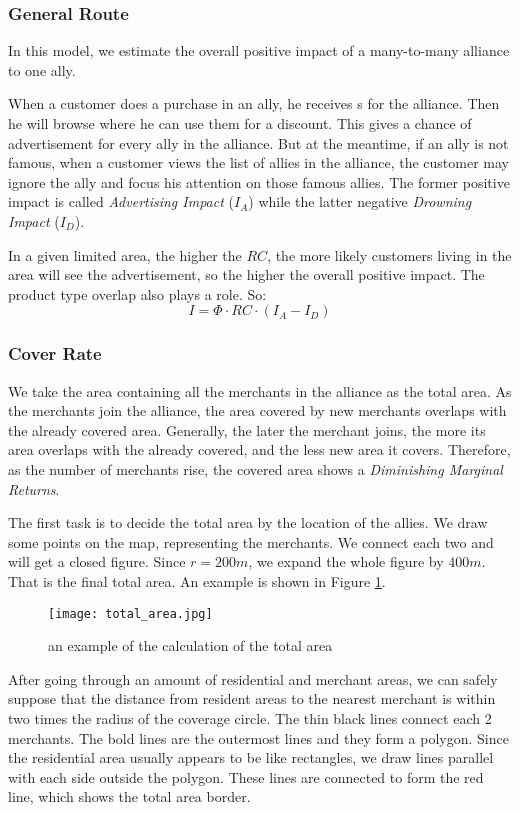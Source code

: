 \subsubsection{General Route}
In this model, we estimate the overall positive impact of a many-to-many alliance to one ally.

When a customer does a purchase in an ally, he receives \RPd s for the alliance. Then he will browse where he can use them for a discount. This gives a chance of advertisement for every ally in the alliance.
But at the meantime, if an ally is not famous, when a customer views the list of allies in the alliance, the customer may ignore the ally and focus his attention on those famous allies.
The former positive impact is called \textsl{Advertising Impact} ($I_A$) while the latter negative \textsl{Drowning Impact} ($I_D$).

In a given limited area, the higher the $RC$, the more likely customers living in the area will see the advertisement, so the higher the overall positive impact. The product type overlap also plays a role. So:
\[  I = \Phi \cdot RC \cdot (I_A - I_D)  \]

\subsubsection{Cover Rate}
We take the area containing all the merchants in the alliance as the total area. As the merchants join the alliance, the area covered by new merchants overlaps with the already covered area. Generally, the later the merchant joins, the more its area overlaps with the already covered, and the less new area it covers. Therefore, as the number of merchants rise, the covered area shows a \textsl{Diminishing Marginal Returns}.

The first task is to decide the total area by the location of the allies. We draw some points on the map, representing the merchants. We connect each two and will get a closed figure. Since $r=200m$, we expand the whole figure by $400m$. That is the final total area. An example is shown in Figure \ref{fig:total_area}.

\begin{figure}[H]
	\centering
	\texttt{[image: total\_area.jpg]}
	\caption{an example of the calculation of the total area}
	\label{fig:total_area}
\end{figure}

After going through an amount of residential and merchant areas, we can safely suppose that the distance from resident areas to the nearest merchant is within two times the radius of the coverage circle. The thin black lines connect each 2 merchants. The bold lines are the outermost lines and they form a polygon. Since the residential area usually appears to be like rectangles, we draw lines parallel with each side outside the polygon. These lines are connected to form the red line, which shows the total area border.

